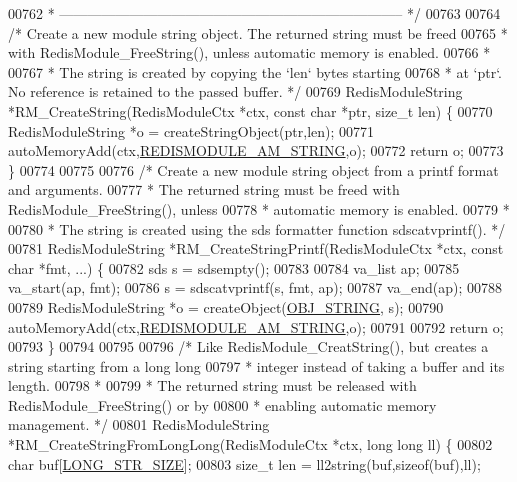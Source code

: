 \begin{DoxyCode}
{00762 \textcolor{comment}{ * -------------------------------------------------------------------------- */}
00763 
00764 \textcolor{comment}{/* Create a new module string object. The returned string must be freed}
00765 \textcolor{comment}{ * with RedisModule\_FreeString(), unless automatic memory is enabled.}
00766 \textcolor{comment}{ *}
00767 \textcolor{comment}{ * The string is created by copying the `len` bytes starting}
00768 \textcolor{comment}{ * at `ptr`. No reference is retained to the passed buffer. */}
00769 RedisModuleString *RM\_CreateString(RedisModuleCtx *ctx, \textcolor{keyword}{const} \textcolor{keywordtype}{char} *ptr, size\_t len) \{
00770     RedisModuleString *o = createStringObject(ptr,len);
00771     autoMemoryAdd(ctx,\hyperlink{module_8c_a566ace39ef8d3d16c3f7d9d6c6b8e4ef}{REDISMODULE\_AM\_STRING},o);
00772     \textcolor{keywordflow}{return} o;
00773 \}
00774 
00775 
00776 \textcolor{comment}{/* Create a new module string object from a printf format and arguments.}
00777 \textcolor{comment}{ * The returned string must be freed with RedisModule\_FreeString(), unless}
00778 \textcolor{comment}{ * automatic memory is enabled.}
00779 \textcolor{comment}{ *}
00780 \textcolor{comment}{ * The string is created using the sds formatter function sdscatvprintf(). */}
00781 RedisModuleString *RM\_CreateStringPrintf(RedisModuleCtx *ctx, \textcolor{keyword}{const} \textcolor{keywordtype}{char} *fmt, ...) \{
00782     sds s = sdsempty();
00783 
00784     va\_list ap;
00785     va\_start(ap, fmt);
00786     s = sdscatvprintf(s, fmt, ap);
00787     va\_end(ap);
00788 
00789     RedisModuleString *o = createObject(\hyperlink{server_8h_a65236ea160f69cdef33ec942092af88f}{OBJ\_STRING}, s);
00790     autoMemoryAdd(ctx,\hyperlink{module_8c_a566ace39ef8d3d16c3f7d9d6c6b8e4ef}{REDISMODULE\_AM\_STRING},o);
00791 
00792     \textcolor{keywordflow}{return} o;
00793 \}
00794 
00795 
00796 \textcolor{comment}{/* Like RedisModule\_CreatString(), but creates a string starting from a long long}
00797 \textcolor{comment}{ * integer instead of taking a buffer and its length.}
00798 \textcolor{comment}{ *}
00799 \textcolor{comment}{ * The returned string must be released with RedisModule\_FreeString() or by}
00800 \textcolor{comment}{ * enabling automatic memory management. */}
00801 RedisModuleString *RM\_CreateStringFromLongLong(RedisModuleCtx *ctx, \textcolor{keywordtype}{long} \textcolor{keywordtype}{long} ll) \{
00802     \textcolor{keywordtype}{char} buf[\hyperlink{server_8h_a39ec35278876f65fc1ef70b049856ca3}{LONG\_STR\_SIZE}];
00803     size\_t len = ll2string(buf,\textcolor{keyword}{sizeof}(buf),ll);
}
\end{DoxyCode}
